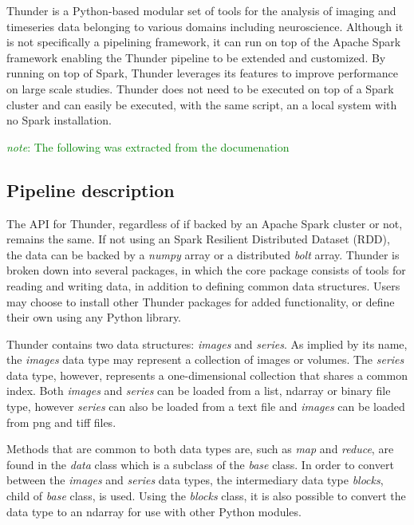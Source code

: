 \documentclass{report}
\newcommand{\note}[1]{\textcolor{green}{\textit{note}: #1}}
\begin{document}
        Thunder is a Python-based modular set of tools for the analysis of imaging and timeseries data belonging
        to various domains including neuroscience. Although it is not specifically a pipelining framework, 
        it can run on top of the Apache
        Spark framework enabling the Thunder pipeline to be extended and customized. By running on top of Spark,
        Thunder leverages its features to improve performance on large scale studies. Thunder does not need to
        be executed on top of a Spark cluster and can easily be executed, with the same script, an a local system
        with no Spark installation. 

        \note{The following was extracted from the documenation}
        \subsection{Pipeline description}
        The API for Thunder, regardless of if backed by an Apache Spark cluster or not, remains the same. If not 
        using an Spark Resilient Distributed Dataset (RDD), the data can be backed by a \textit{numpy} array or a
        distributed \textit{bolt} array. Thunder is broken down into several packages, in which the core package
        consists of tools for reading and writing data, in addition to defining common data structures. Users may
        choose to install other Thunder packages for added functionality, or define their own using any Python
        library.        
 

        Thunder contains two data structures: \textit{images} and \textit{series}. As implied by its name, the 
        \textit{images} data type may represent a collection of images or volumes. 
        The \textit{series} data type,
        however, represents a one-dimensional collection that shares a common index. Both \textit{images} and 
        \textit{series} can be loaded from a list, ndarray or binary file type, however \textit{series} can also 
        be loaded from a text file and \textit{images} can be loaded from png and tiff files.

        Methods that are common to both data types are, such as \textit{map} and \textit{reduce}, are found in the 
        \textit{data} class which is a subclass of the
        \textit{base} class. In order to convert between the \textit{images} and \textit{series} data types, the
        intermediary data type \textit{blocks}, child of \textit{base} class,  is used. 
        Using the \textit{blocks} class, it is also possible to convert the data type to an ndarray for use with other
        Python modules. 
\end{document}
